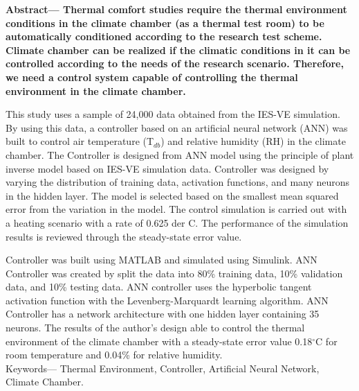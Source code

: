 \documentclass[a4paper,10pt]{article}
\begin{document}
	\vspace{0.3cm}
	
	{\setlength{\parindent}{0cm}\bfseries
		Abstract--- Thermal comfort studies require the thermal environment conditions in the climate chamber (as a thermal test room) to be automatically conditioned according to the research test scheme. Climate chamber can be realized if the climatic conditions in it can be controlled according to the needs of the research scenario. Therefore, we need a control system capable of controlling the thermal environment in the climate chamber.
		
		\qquad This study uses a sample of 24,000 data obtained from the IES-VE simulation. By using this data, a controller based on an artificial neural network (ANN) was built to control air temperature (T$_{db}$) and relative humidity (RH) in the climate chamber. The Controller is designed from ANN model using the principle of plant inverse model based on IES-VE simulation data. Controller was designed by varying the distribution of training data, activation functions, and many neurons in the hidden layer. The model is selected based on the smallest mean squared error from the variation in the model. The control simulation is carried out with a heating scenario with a rate of 0.625 der C. The performance of the simulation results is reviewed through the steady-state error value.
		
		\qquad Controller was built using MATLAB and simulated using Simulink. ANN Controller was created by split the data into 80\% training data, 10\% validation data, and 10\% testing data. ANN controller uses the hyperbolic tangent activation function with the Levenberg-Marquardt learning algorithm. ANN Controller has a network architecture with one hidden layer containing 35 neurons. The results of the author's design able to control the thermal environment of the climate chamber with a steady-state error value 0.18$^\circ$C for room temperature and 0.04\% for relative humidity.\\
		
		Keywords--- Thermal Environment, Controller, Artificial Neural Network, Climate Chamber.
	}

	\vspace{2cm}
	
\end{document}
